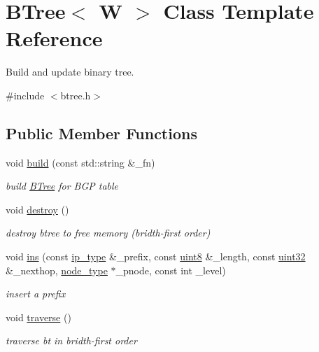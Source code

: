 \hypertarget{classBTree}{\section{B\-Tree$<$ W $>$ Class Template Reference}
\label{classBTree}
}


Build and update binary tree.  




{\ttfamily \#include $<$btree.\-h$>$}

\subsection*{Public Member Functions}
\begin{DoxyCompactItemize}
\item 
void \hyperlink{classBTree_a454d071612286f059eeed1de015a0705}{build} (const std\-::string \&\-\_\-fn)
\begin{DoxyCompactList}\small\item\em build \hyperlink{classBTree}{B\-Tree} for B\-G\-P table \end{DoxyCompactList}\item 
void \hyperlink{classBTree_a15b494cc96ba42c55fac37b242c20d9f}{destroy} ()
\begin{DoxyCompactList}\small\item\em destroy btree to free memory (bridth-\/first order) \end{DoxyCompactList}\item 
void \hyperlink{classBTree_a5aa850fb6057b56803556533104fa762}{ins} (const \hyperlink{classBTree_a01d338c5749bb49768463706d9d2141c}{ip\-\_\-type} \&\-\_\-prefix, const \hyperlink{types_8h_a34ecedcf03a70dc91e4616212d79267d}{uint8} \&\-\_\-length, const \hyperlink{types_8h_abd01e8e67e3d94cab04ecaaf4f85ac1b}{uint32} \&\-\_\-nexthop, \hyperlink{classBTree_a6868250b9b4cb60d672f2c83be3889f4}{node\-\_\-type} $\ast$\-\_\-pnode, const int \-\_\-level)
\begin{DoxyCompactList}\small\item\em insert a prefix \end{DoxyCompactList}\item 
void \hyperlink{classBTree_a47bc53476d89b85f4e73eee488fe9e44}{traverse} ()
\begin{DoxyCompactList}\small\item\em traverse bt in bridth-\/first order \end{DoxyCompactList}\item 

\end{DoxyCompactItemize}
